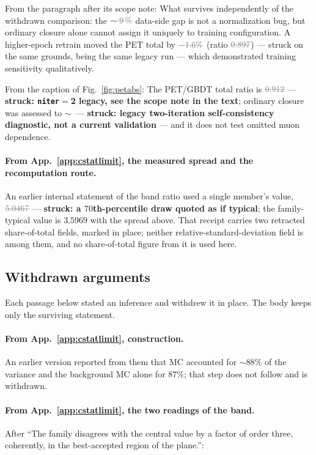 From the paragraph after its scope note: What survives independently of the withdrawn comparison: the $\dead{\sim\SI{\petGbdtGap}{\percent}}$ data-side gap is not a normalization bug, but ordinary closure alone cannot assign it uniquely to training configuration. A higher-epoch retrain moved the PET total by $\dead{-1.6\%}$ (ratio $\dead{0.897}$) --- struck on the same grounds, being the same legacy run --- which demonstrated training sensitivity qualitatively.

From the caption of Fig.~\ref{fig:petabs}: The PET/GBDT total ratio is $\dead{\petRatio}$ --- \textbf{struck: \texttt{niter}${}={}$2 legacy, see the scope note in the text}; ordinary closure was assessed to $\sim$\,\dead{\SI{\petClosure}{\percent}} --- \textbf{struck: legacy two-iteration self-consistency diagnostic, not a current validation} --- and it does not test omitted muon dependence.

\paragraph{From App.~\ref{app:cstatlimit}, the measured spread and the recomputation route.} An earlier internal statement of the band ratio used a single member's value, $\dead{5.0467}$ --- \textbf{struck: a $70$th-percentile draw quoted as if typical}; the family-typical value is $3.5969$ with the spread above. That receipt carries two retracted share-of-total fields, marked in place; neither relative-standard-deviation field is among them, and no share-of-total figure from it is used here.

\subsection{Withdrawn arguments}
\label{app:history-pet-withdrawn}

Each passage below stated an inference and withdrew it in place. The body keeps only the surviving statement.

\paragraph{From App.~\ref{app:cstatlimit}, construction.} An earlier version reported from them that MC accounted for ${\sim}88\%$ of the variance and the background MC alone for $87\%$; that step does not follow and is withdrawn.

\paragraph{From App.~\ref{app:cstatlimit}, the two readings of the band.} After ``The family disagrees with the central value by a factor of order three, coherently, in the best-accepted region of the plane.'':

